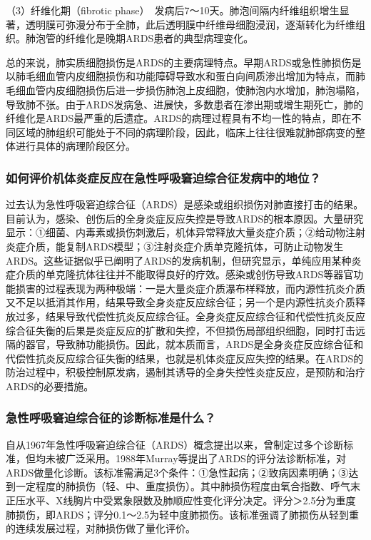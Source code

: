 （3）纤维化期（fibrotic
phase）　发病后7～10天。肺泡间隔内纤维组织增生显著，透明膜可弥漫分布于全肺，此后透明膜中纤维母细胞浸润，逐渐转化为纤维组织。肺泡管的纤维化是晚期ARDS患者的典型病理变化。

总的来说，肺实质细胞损伤是ARDS的主要病理特点。早期ARDS或急性肺损伤是以肺毛细血管内皮细胞损伤和功能障碍导致水和蛋白向间质渗出增加为特点，而肺毛细血管内皮细胞损伤后进一步损伤肺泡上皮细胞，使肺泡内水增加，肺泡塌陷，导致肺不张。由于ARDS发病急、进展快，多数患者在渗出期或增生期死亡，肺的纤维化是ARDS最严重的后遗症。ARDS的病理过程具有不均一性的特点，即在不同区域的肺组织可能处于不同的病理阶段，因此，临床上往往很难就肺部病变的整体进行具体的病理阶段区分。

\subsubsection{如何评价机体炎症反应在急性呼吸窘迫综合征发病中的地位？}

过去认为急性呼吸窘迫综合征（ARDS）是感染或组织损伤对肺直接打击的结果。目前认为，感染、创伤后的全身炎症反应失控是导致ARDS的根本原因。大量研究显示：①细菌、内毒素或损伤刺激后，机体异常释放大量炎症介质；②给动物注射炎症介质，能复制ARDS模型；③注射炎症介质单克隆抗体，可防止动物发生ARDS。这些证据似乎已阐明了ARDS的发病机制，但研究显示，单纯应用某种炎症介质的单克隆抗体往往并不能取得良好的疗效。感染或创伤导致ARDS等器官功能损害的过程表现为两种极端：一是大量炎症介质瀑布样释放，而内源性抗炎介质又不足以抵消其作用，结果导致全身炎症反应综合征；另一个是内源性抗炎介质释放过多，结果导致代偿性抗炎反应综合征。全身炎症反应综合征和代偿性抗炎反应综合征失衡的后果是炎症反应的扩散和失控，不但损伤局部组织细胞，同时打击远隔的器官，导致肺功能损伤。因此，就本质而言，ARDS是全身炎症反应综合征和代偿性抗炎反应综合征失衡的结果，也就是机体炎症反应失控的结果。在ARDS的防治过程中，积极控制原发病，遏制其诱导的全身失控性炎症反应，是预防和治疗ARDS的必要措施。

\subsubsection{急性呼吸窘迫综合征的诊断标准是什么？}

自从1967年急性呼吸窘迫综合征（ARDS）概念提出以来，曾制定过多个诊断标准，但均未被广泛采用。1988年Murray等提出了ARDS的评分法诊断标准，对ARDS做量化诊断。该标准需满足3个条件：①急性起病；②致病因素明确；③达到一定程度的肺损伤（轻、中、重度损伤）。其中肺损伤程度由氧合指数、呼气末正压水平、X线胸片中受累象限数及肺顺应性变化评分决定。评分＞2.5分为重度肺损伤，即ARDS；评分0.1～2.5为轻中度肺损伤。该标准强调了肺损伤从轻到重的连续发展过程，对肺损伤做了量化评价。

